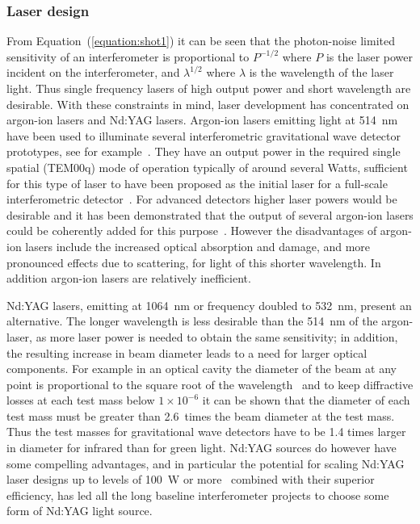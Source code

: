 \documentclass{article}
\begin{document}

\subsubsection{Laser design}
\label{subsubsection:laserdesign}

From Equation~(\ref{equation:shot1}) it can be seen that the
photon-noise limited sensitivity of an interferometer is proportional
to $P^{-1/2}$ where $P$ is the laser power incident on the
interferometer, and $\lambda^{1/2}$ where $\lambda$ is the wavelength
of the laser light. Thus single frequency lasers of high output power
and short wavelength are desirable. With these constraints in mind,
laser development has concentrated on argon-ion lasers and Nd:YAG
lasers.  Argon-ion lasers emitting light at 514~nm have been used to
illuminate several interferometric gravitational wave detector
prototypes, see for example~\cite{Shoemaker, Robertson}. They have an
output power in the required single spatial (TEM00q) mode of operation
typically of around several Watts, sufficient for this type of laser
to have been proposed as the initial laser for a full-scale
interferometric detector~\cite{Vogt}. For advanced detectors higher
laser powers would be desirable and it has been demonstrated that the
output of several argon-ion lasers could be coherently added for this
purpose~\cite{Kerr}. However the disadvantages of argon-ion lasers
include the increased optical absorption and damage, and more
pronounced effects due to scattering, for light of this shorter
wavelength. In addition argon-ion lasers are relatively inefficient.

Nd:YAG lasers, emitting at 1064~nm or frequency doubled to 532~nm,
present an alternative. The longer wavelength is less desirable than
the 514~nm of the argon-laser, as more laser power is needed to obtain
the same sensitivity; in addition, the resulting increase in beam
diameter leads to a need for larger optical components. For example in
an optical cavity the diameter of the beam at any point is
proportional to the square root of the wavelength~\cite{Kogelnik} and
to keep diffractive losses at each test mass below $1 \times 10^{-6}$
it can be shown that the diameter of each test mass must be greater
than 2.6~times the beam diameter at the test mass. Thus the test
masses for gravitational wave detectors have to be 1.4 times larger in
diameter for infrared than for green light. Nd:YAG sources do however
have some compelling advantages, and in particular the potential for
scaling Nd:YAG laser designs up to levels of 100~W or
more~\cite{Shine} combined with their superior efficiency, has led all
the long baseline interferometer projects to choose some form of
Nd:YAG light source.
\end{document}
